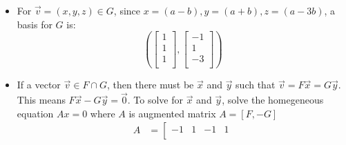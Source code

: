 \documentclass[12pt]{article}
\begin{document}
\begin{enumerate}[label=(\alph*)]
\begin{itemize}
\begin{equation*}
\begin{matrix}
                                            0\\
                                            1
                                        \end{matrix}
                                    \right]
                                \right)
                            \end{equation*}
                        \item For $\vec{v} = (x, y, z) \in G$, since $x = (a - b), y = (a + b), z = (a - 3b)$, a basis for $G$ is:
                            \begin{equation*}
                                \left(
                                    \left[
                                        \begin{matrix}
                                            1\\
                                            1\\
                                            1\\
                                        \end{matrix}
                                    \right],
                                    \left[
                                        \begin{matrix}
                                            -1\\
                                            1\\
                                            -3\\
                                        \end{matrix}
                                    \right]
                                \right)
                            \end{equation*}
                        \item If a vector $\vec{v} \in F \cap G$, then there 
                            must be $\vec{x}$ and $\vec{y}$ such that $\vec{v} = F\vec{x} = G\vec{y}$.
                            This means $F\vec{x}-G\vec{y}=\vec{0}$. To solve for $\vec{x}$ and $\vec{y}$, solve the homegeneous equation $Ax=0$ where $A$ is augmented matrix $A = [F, -G]$
                            \begin{align*}
                                A &= \left[
                                    \begin{matrix}
                                        -1 & 1 & -1 & 1\\

\end{matrix}
\end{align*}
\end{itemize}
\end{enumerate}
\end{document}
